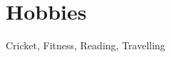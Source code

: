 \documentclass{resume}
\begin{document}
          \vspace{1pt}
      
    \resumeSubHeadingListEnd


\section{Hobbies}
  \resumeSubHeadingListStart
    \small{\item{Cricket, Fitness, Reading, Travelling}}
  \resumeSubHeadingListEnd



        




    
    
\end{document}
